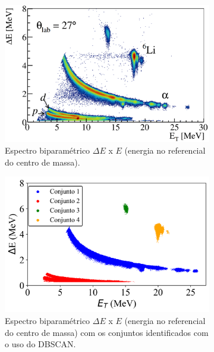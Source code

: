 \documentclass[a4paper,12pt,oneside]{book}
\begin{document}
\begin{figure}[H]
\centering
    \begin{subfigure}[t]{0.48\textwidth}
        \centering
        \includegraphics[scale=0.21]{figs/espectro_1.png}
        \caption{Espectro biparamétrico $\Delta E$ x $E$ (energia no referencial do centro de massa).}
        \label{subfig:espectro_1}
    \end{subfigure}%
    \hfill
    \begin{subfigure}[t]{0.48\textwidth}
        \centering
        \includegraphics[scale=0.52]{figs/espectro_2.png}
        \caption{Espectro biparamétrico $\Delta E$ x $E$ (energia no referencial do centro de massa) com os conjuntos identificados com o uso do DBSCAN.}
        \label{subfig:espectro_2}
    \end{subfigure}
\caption{}
\label{fig:n_peaks_results}
\end{figure}
\end{document}
